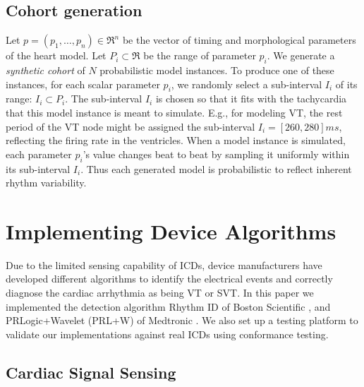 \subsection{Cohort generation}
\label{sec:cohort generation}
Let $p = (p_1,\ldots,p_n) \in \Re^n$ be the vector of timing and morphological parameters of the heart model.
Let $P_i \subset \Re$ be the range of parameter $p_i$.
We generate a \emph{synthetic cohort} of $N$ probabilistic model instances.
To produce one of these instances, for each scalar parameter $p_i$, we randomly select a sub-interval $I_i$ of its range: $I_i \subset P_i$.
The sub-interval $I_i$ is chosen so that it fits with the tachycardia that this model instance is meant to simulate.
E.g., for modeling VT, the rest period of the VT node might be assigned the sub-interval $I_i = [260, 280]ms$, reflecting the firing rate in the ventricles.
When a model instance is simulated, each parameter $p_i$'s value changes beat to beat by sampling it uniformly within its sub-interval $I_i$.
Thus each generated model is probabilistic to reflect inherent rhythm variability.

\section{Implementing Device Algorithms} 
\label{sec:device models}
Due to the limited sensing capability of ICDs, device manufacturers have developed different algorithms to identify the electrical events and correctly diagnose the cardiac arrhythmia as being VT or SVT.
In this paper we implemented the detection algorithm Rhythm ID of Boston Scientific \cite{compass,Ellenbogen11_Pacingbook},%
and PRLogic+Wavelet (PRL+W) of Medtronic \cite{Singer,Wavelet}.
We also set up a testing platform to validate our implementations against real ICDs using conformance testing.
\subsection{Cardiac Signal Sensing}
\label{sec:sensing}

